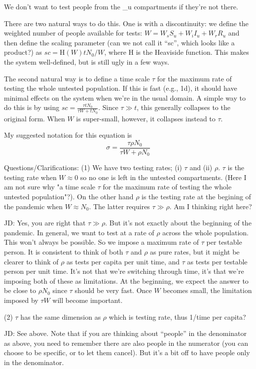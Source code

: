 We don't want to test people from the \_u compartments if they're not there.

There are two natural ways to do this. One is with a discontinuity: we define 
the weighted number of people available for tests: $W = W_s S_u + W_i I_u + W_r R_u$ and then define the scaling parameter (can we not call it ``sc'', which looks like a product?) as $sc = \textrm{H}(W) tN_0/W$, where H is the Heaviside function. This makes the system well-defined, but is still ugly in a few ways.

The second natural way is to define a time scale $\tau$ for the maximum rate of testing the whole untested population. If this is fast (e.g., 1d), it should have minimal effects on the system when we're in the usual domain. A simple way to do this is by using $sc = \frac{\tau tN_0}{\tau W + t N_0}$. Since $\tau \gg t$, this generally collapses to the original form. When $W$ is super-small, however, it collapses instead to $\tau$.

My suggested notation for this equation is $$\sigma = \frac{\tau \rho N_0}{\tau W + \rho N_0}$$

Questions/Clarifications:
(1) We have two testing rates; (i) $\tau$ and (ii) $\rho$.
$\tau$ is the testing rate when $W \approx 0$ so no one is left in the untested compartments. (Here I am not sure why "a time scale $\tau$ for the maximum rate of testing the whole untested population"?).
On the other hand $\rho$ is the testing rate at the begining of the pandemic when $W \approx N_0$. The latter requires $\tau \gg \rho$. Am I thinking right here?  

JD: Yes, you are right that $\tau \gg \rho$. But it's not exactly about the beginning of the pandemic. In general, we want to test at a rate of $\rho$ across the whole population. This won't always be possible. So we impose a maximum rate of $\tau$ per testable person. It is consistent to think of both $\tau$ and $\rho$ as pure rates, but it might be clearer to think of $\rho$ as tests per capita per unit time, and $\tau$ as tests per testable person per unit time. It's not that we're switching through time, it's that we're imposing both of these as limitations. At the beginning, we expect the answer to be close to $\rho N_0$ since $\tau$ should be very fast. Once $W$ becomes small, the limitation imposed by $\tau W$ will become important.

(2) $\tau$ has the same dimension as $\rho$ which is testing rate, thus 1/time per capita?

JD: See above. Note that if you are thinking about ``people'' in the denominator as above, you need to remember there are also people in the numerator (you can choose to be specific, or to let them cancel). But it's a bit off to have people only in the denominator.

